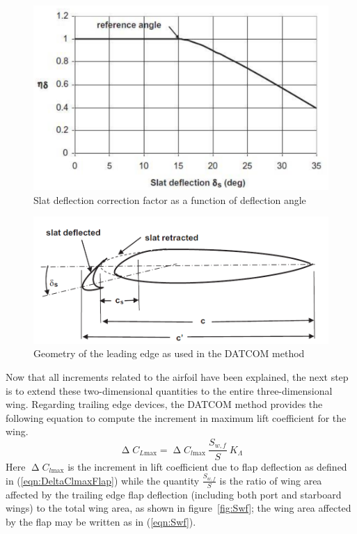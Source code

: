 %
\begin{figure}[H]
\centering
\includegraphics[width=0.8\linewidth]{Eta_Delta_Slat}
\caption{Slat deflection correction factor as a function of deflection angle}
\label{fig:etaDeltaSlat}
\end{figure}
%
\begin{figure}[H]
\centering
\includegraphics[width=0.8\linewidth]{deltaSlat_c'c}
\caption{Geometry of the leading edge as used in the DATCOM method}
\label{fig:c'c_deltaSlat}
\end{figure}
%
\noindent
Now that all increments related to the airfoil have been explained, the next step is to extend these two-dimensional quantities to the entire three-dimensional wing.
Regarding trailing edge devices, the \gls{DATCOM} method provides the following equation to compute the increment in maximum lift coefficient for the wing.
%
\begin{equation}
\upDelta C_{L\text{max}}=\upDelta C_{l\text{max}}\ \dfrac{S_{w,f}}{S}\ K_\Lambda
\label{eqn:DeltaCLmaxFlap}
\end{equation}
%
\noindent
Here $\upDelta C_{l\text{max}}$ is the increment in lift coefficient due to flap deflection as defined in (\ref{eqn:DeltaClmaxFlap}) while the quantity $\frac{S_{w,f}}{S}$ is the ratio of wing area affected by the trailing edge flap deflection (including both port and starboard wings) to the total wing area, as shown in figure~\ref{fig:Swf}; the wing area affected by the flap may be written as in (\ref{eqn:Swf}).

